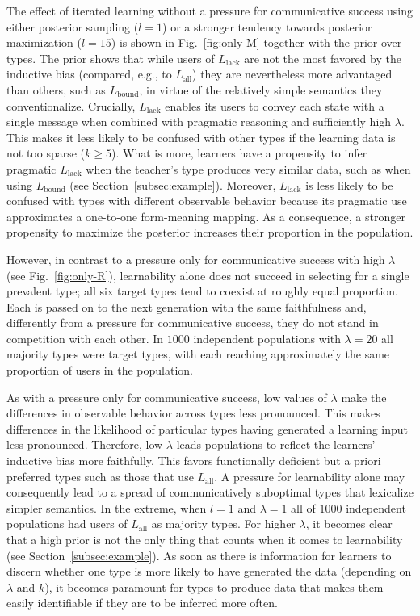 \documentclass[a4paper, 11pt]{article}
\theoremstyle{Satz}
\newcommand{\mylang}[1]{\ensuremath{L_{\text{#1}}}\xspace} %
\newcommand{\Lall}{\mylang{all}}
\newcommand{\Lbound}{\mylang{bound}}
\newcommand{\Llack}{\mylang{lack}}
\begin{document}
The effect of iterated learning without a pressure for communicative success using either
posterior sampling ($l = 1$) or a stronger tendency towards posterior maximization ($l = 15$)
is shown in Fig.~\ref{fig:only-M} together with the prior over types. The prior shows that
while users of $\Llack$ are not the most favored by the inductive bias (compared, e.g., to
$\Lall$) they are nevertheless more advantaged than others, such as $\Lbound$, in virtue of the
relatively simple semantics they conventionalize. Crucially, $\Llack$ enables its users to
convey each state with a single message when combined with pragmatic reasoning and sufficiently
high $\lambda$. This makes it less likely to be confused with other types if the learning data
is not too sparse ($k \geq 5$). What is more, learners have a propensity to infer pragmatic
$\Llack$ when the teacher's type produces very similar data, such as when using $\Lbound$ (see
Section~\ref{subsec:example}). Moreover, $\Llack$ is less likely to be confused with types with
different observable behavior because its pragmatic use approximates a one-to-one form-meaning
mapping. As a consequence, a stronger propensity to maximize the posterior increases their
proportion in the population.

However, in contrast to a pressure only for communicative success with high $\lambda$ (see
Fig.~\ref{fig:only-R}), learnability alone does not succeed in selecting for a single
prevalent type; all six target types tend to coexist at roughly equal proportion. Each
is passed on to the next generation with the same faithfulness and, differently from a pressure
for communicative success, they do not stand in competition with each other. In $1000$
independent populations with $\lambda = 20$ all majority types were target types,
with each reaching approximately the same proportion of users in the population.

As with a pressure only for communicative success, low values of $\lambda$ make the differences
in observable behavior across types less pronounced. This makes differences in the likelihood
of particular types having generated a learning input less pronounced. Therefore, low $\lambda$
leads populations to reflect the learners' inductive bias more faithfully. This favors
functionally deficient but a priori preferred types such as those that use $\Lall$. A pressure
for learnability alone may consequently lead to a spread of communicatively suboptimal types
that lexicalize simpler semantics. In the extreme, when $l = 1$ and $\lambda = 1$ all of $1000$
independent populations had users of $\Lall$ as majority types. For higher $\lambda$, it
becomes clear that a high prior is not the only thing that counts when it comes to learnability
(see Section~\ref{subsec:example}). As soon as there is information for learners to discern
whether one type is more likely to have generated the data (depending on $\lambda$ and $k$), it
becomes paramount for types to produce data that makes them easily identifiable if they are to
be inferred more often.
\end{document}
